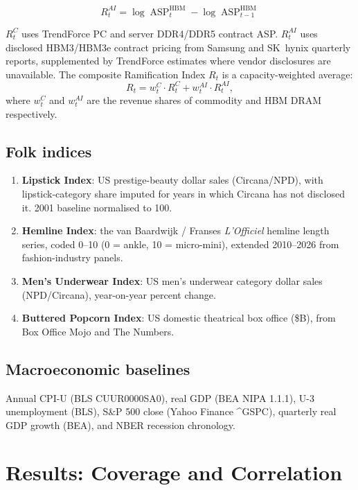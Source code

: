 \documentclass[12pt]{article}
\theoremstyle{definition}
\DeclareMathOperator{\ASP}{ASP}
\begin{document}
\begin{equation}
\label{eq:ai_index}
R_t^{AI} = \log \ASP^{\text{HBM}}_t - \log \ASP^{\text{HBM}}_{t-1}
\end{equation}

$R_t^C$ uses TrendForce PC and server DDR4/DDR5 contract ASP. $R_t^{AI}$ uses disclosed HBM3/HBM3e contract pricing from Samsung and SK~hynix quarterly reports, supplemented by TrendForce estimates where vendor disclosures are unavailable. The composite Ramification Index $R_t$ is a capacity-weighted average:
\begin{equation}
\label{eq:composite}
R_t = w_t^C \cdot R_t^C + w_t^{AI} \cdot R_t^{AI},
\end{equation}
where $w_t^C$ and $w_t^{AI}$ are the revenue shares of commodity and HBM DRAM respectively.

\subsection{Folk indices}

\begin{enumerate}[itemsep=2pt]
\item \textbf{Lipstick Index}: US prestige-beauty dollar sales (Circana/NPD), with lipstick-category share imputed for years in which Circana has not disclosed it. 2001 baseline normalised to 100.
\item \textbf{Hemline Index}: the van Baardwijk / Franses \emph{L'Officiel} hemline length series, coded 0--10 (0 = ankle, 10 = micro-mini), extended 2010--2026 from fashion-industry panels.
\item \textbf{Men's Underwear Index}: US men's underwear category dollar sales (NPD/Circana), year-on-year percent change.
\item \textbf{Buttered Popcorn Index}: US domestic theatrical box office (\$B), from Box Office Mojo and The Numbers.
\end{enumerate}

\subsection{Macroeconomic baselines}

Annual CPI-U (BLS CUUR0000SA0), real GDP (BEA NIPA 1.1.1), U-3 unemployment (BLS), S\&P 500 close (Yahoo Finance \^{}GSPC), quarterly real GDP growth (BEA), and NBER recession chronology.


\section{Results: Coverage and Correlation}
\label{sec:results}
\end{document}
